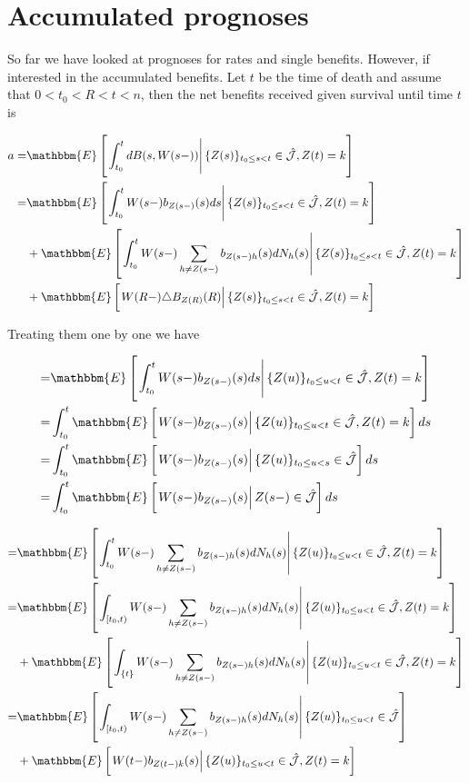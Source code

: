 \documentclass{book}
\newcommand{\1}[1]{\mathbbm{1}_{\left\lbrace #1 \right\rbrace}}
\newcommand{\econd}[2][def]{\mathbbm{E} \left[ \left. #1 \right| #2 \right]}
\theoremstyle{break}
\theoremstyle{remark}
\numberwithin{equation}{section}
\begin{document}
\chapter{Accumulated prognoses}

So far we have looked at prognoses for rates and single benefits. However, if interested in the accumulated benefits. Let $t$ be the time of death and assume that $0<t_0<R<t<n$, then the net benefits received given survival until time $t$ is

\begin{align*}
	a =& \econd[\int_{t_0}^t dB(s,W(s-))]{ \{ Z(s) \}_{t_0 \leq s < t} \in \hat{\mathcal{J}}, Z(t) = k} \\
	=& \econd[\int_{t_0}^t W(s-) b_{Z(s-)}(s) ds]{ \{ Z(s) \}_{t_0 \leq s < t} \in \hat{\mathcal{J}}, Z(t) = k} \\
	&+ \econd[\int_{t_0}^t W(s-) \sum_{h \neq Z(s-)} b_{Z(s-)h}(s) dN_h(s)]{ \{ Z(s) \}_{t_0 \leq s < t} \in \hat{\mathcal{J}}, Z(t) = k} \\
	&+ \econd[W(R-) \triangle B_{Z(R)}(R)]{ \{ Z(s) \}_{t_0 \leq s < t} \in \hat{\mathcal{J}}, Z(t) = k} \\
\end{align*}

Treating them one by one we have

\begin{align*}
	=& \econd[\int_{t_0}^t W(s-) b_{Z(s-)}(s) ds]{ \{ Z(u) \}_{t_0 \leq u < t} \in \hat{\mathcal{J}}, Z(t) = k} \\
	=& \int_{t_0}^t \econd[ W(s-) b_{Z(s-)}(s)]{ \{ Z(u) \}_{t_0 \leq u < t} \in \hat{\mathcal{J}}, Z(t) = k} ds \\
	=& \int_{t_0}^t \econd[ W(s-) b_{Z(s-)}(s)]{ \{ Z(u) \}_{t_0 \leq u < s} \in \hat{\mathcal{J}}} ds \\
	=& \int_{t_0}^t \econd[ W(s-) b_{Z(s-)}(s)]{ Z(s-) \in \hat{\mathcal{J}}} ds \\
\end{align*}

\begin{align*}
	=& \econd[\int_{t_0}^t W(s-) \sum_{h \neq Z(s-)} b_{Z(s-)h}(s) dN_h(s)]{ \{ Z(u) \}_{t_0 \leq u < t} \in \hat{\mathcal{J}}, Z(t) = k} \\
	=& \econd[\int_{[t_0,t)} W(s-) \sum_{h \neq Z(s-)} b_{Z(s-)h}(s) dN_h(s)]{ \{ Z(u) \}_{t_0 \leq u < t} \in \hat{\mathcal{J}}, Z(t) = k} \\
	&+ \econd[\int_{\{t\}} W(s-) \sum_{h \neq Z(s-)} b_{Z(s-)h}(s) dN_h(s)]{ \{ Z(u) \}_{t_0 \leq u < t} \in \hat{\mathcal{J}}, Z(t) = k} \\
	=& \econd[\int_{[t_0,t)} W(s-) \sum_{h \neq Z(s-)} b_{Z(s-)h}(s) dN_h(s)]{ \{ Z(u) \}_{t_0 \leq u < t} \in \hat{\mathcal{J}}} \\
	&+ \econd[W(t-) b_{Z(t-)k}(s)]{ \{ Z(u) \}_{t_0 \leq u < t} \in \hat{\mathcal{J}}, Z(t) = k} 
\end{align*}
\end{document}
